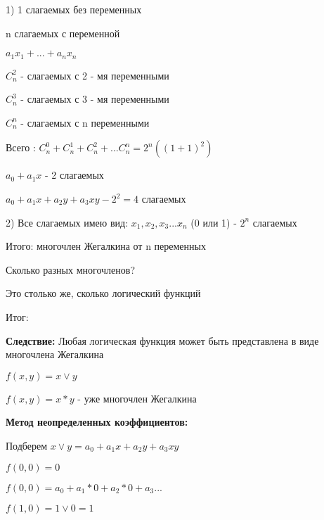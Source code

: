 \documentclass[russian]{lecture-notes}
\begin{document}
\begin{sloppypar}
\begin{proposition}
            1) 1 слагаемых без переменных

            n слагаемых с переменной

            \qquad $a_{1}x_{1} + ... + a_{n}x_{n}$

            $C_{n}^{2}$ - слагаемых с 2 - мя переменными

            $C_{n}^{3}$ - слагаемых с 3 - мя переменными

            $C_{n}^{n}$ - слагаемых с n переменными

            Всего : $ C_{n}^{0} + C_{n}^{1} + C_{n}^{2} + ... C_{n}^{n} = 2^{n}((1+1)^{2}) $

            \begin{example}

                $a_{0} + a_{1}x$ - 2 слагаемых

                $a_{0} + a_{1}x + a_{2}y+a_{3}xy - 2^2 = 4$ слагаемых

                2) Все слагаемых имею вид: $x_{1},x_{2},x_{3}...x_{n}$ (0 или 1) - $2^n$ слагаемых

                Итого: многочлен Жегалкина от n переменных
            \end{example}


            \begin{problem}
                Сколько разных многочленов?

                Это столько же, сколько логический функций

                Итог:

                \textbf{Следствие:} Любая логическая функция может быть представлена в виде многочлена Жегалкина

            \end{problem}

            \begin{example}

                $f(x,y) = x \lor y$

                $f(x,y) = x*y$ - уже многочлен Жегалкина

                \textbf{Метод неопределенных коэффициентов:}


                Подберем $x \lor y = a_{0} + a_{1}x + a_{2}y + a_{3}xy$

                $f(0,0) = 0$

                $f(0,0) = a_{0} + a_{1}*0 + a_{2}*0 + a_{3}...$

                $f(1,0) = 1 \lor 0 = 1$


\end{example}
\end{proposition}
\end{sloppypar}
\end{document}
